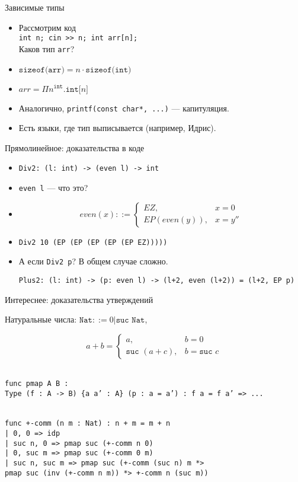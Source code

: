 \documentclass[aspectratio=169]{beamer}
\begin{document}
\begin{frame}{Зависимые типы}
\begin{itemize}\item Рассмотрим код\\ \texttt{int n; cin >{}>{} n; int arr[n];} \\
Каков тип \texttt{arr}? \pause
\item $\texttt{sizeof(arr)} = n \cdot \texttt{sizeof(int)}$ \pause
\item $arr = \Pi n^{\texttt{int}}.\texttt{int[}n\texttt{]}$ \pause
\item Аналогично, \texttt{printf(const char*, ...)} --- капитуляция. \pause
\item Есть языки, где тип выписывается (например, Идрис).
\end{itemize}
\end{frame}

\begin{frame}{Прямолинейное: доказательства в коде}
\begin{itemize}
\item \texttt{Div2: (l: int) -> (even l) -> int}\pause
\item \texttt{even l} --- что это?\pause
\item $$even (x) ::= \left\{\begin{array}{ll} EZ, & x = 0\\ EP(even(y)), & x = y''\end{array}\right.$$\pause
\item \texttt{Div2 10 (EP (EP (EP (EP (EP EZ)))))}\pause
\item А если \texttt{Div2 p}? В общем случае сложно.

\texttt{Plus2: (l: int) -> (p: even l) -> (l+2, even (l+2)) = (l+2, EP p)}
\end{itemize}
\end{frame}

\begin{frame}{Интереснее: доказательства утверждений}

Натуральные числа: $\texttt{Nat} ::= 0 | \texttt{suc Nat}$,

$$a + b = \left\{\begin{array}{ll} a, & b = 0\\ \texttt{suc }(a + c), & b = \texttt{suc }c\end{array}\right.$$

\texttt{\\func pmap {A B : \\Type} (f : A -> B) \{a a' : A\} (p : a = a') : f a = f a' => ...}

\texttt{\\func +-comm (n m : Nat) : n + m = m + n\\
  | 0, 0 => idp\\
  | suc n, 0 => pmap suc (+-comm n 0)\\
  | 0, suc m => pmap suc (+-comm 0 m)\\
  | suc n, suc m => pmap suc (+-comm (suc n) m *> \\
                    pmap suc (inv (+-comm n m)) *> +-comm n (suc m))}

\end{frame}
\end{document}
